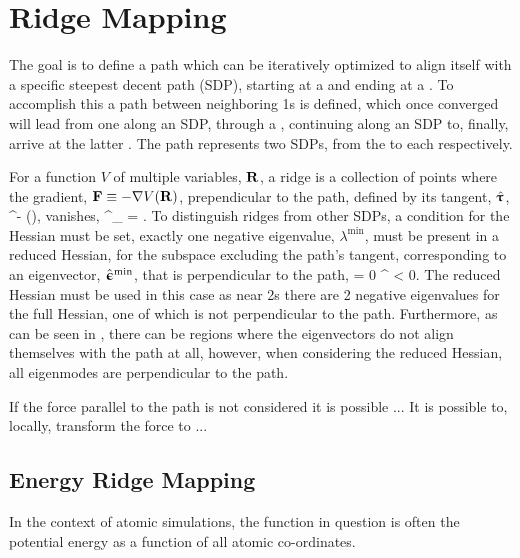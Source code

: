 \section{Ridge Mapping}
The goal is to define a path which can be iteratively optimized to align itself with a specific steepest decent path (SDP),
starting at a  and ending at a .
To accomplish this a path between neighboring \sap1s is defined,
which once converged will lead from one  along an SDP,
through a ,
continuing along an SDP to, finally, arrive at the latter .
The path represents two SDPs, from the  to each  respectively.

For a function $V$ of multiple variables, ${\mathrm{\mathbf{\bm{R}}}}$, a ridge is a collection of points where the gradient, ${\mathrm{\mathbf{\bm{F}}}} \equiv -\nabla V({\mathrm{\mathbf{\bm{R}}}})$, prependicular to the path, defined by its tangent, $\hat{{\mathrm{\mathbf{\bm{\uptau}}}}}$,
\vF^\perp \equiv \vF - (\vF \cdot \uvt)\uvt,
\eeq
vanishes,
\vF^\perp_ = .
\eeq
To distinguish ridges from other SDPs,
a condition for the Hessian must be set,
exactly one negative eigenvalue, $\lambda^\text{min}$, must be present in a reduced Hessian, for the subspace excluding the path's tangent,
corresponding to an eigenvector, $\hat{{\mathrm{\mathbf{\bm{\upepsilon}}}}}^\text{min}$, that is perpendicular to the path,
\uvm \cdot \uvt = 0 \quad {} \quad \lambda^ < 0.
\eeq
The reduced Hessian must be used in this case as near \sap2s there are 2 negative eigenvalues for the full Hessian, one of which is not perpendicular to the path.
Furthermore, as can be seen in , there can be regions where the eigenvectors do not align themselves with the path at all,
however, when considering the reduced Hessian, all eigenmodes are perpendicular to the path.

If the force parallel to the path is not considered it is possible ...
It is possible to, locally, transform the force to ...



\incomplete

\subsection{Energy Ridge Mapping}
In the context of atomic simulations, the function in question is often the potential energy as a function of all atomic co-ordinates.

\incomplete

